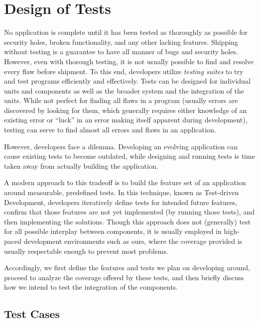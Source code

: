 \chapter{Design of Tests}

No application is complete until it has been tested
as thoroughly as possible for security holes, broken
functionality, and any other lacking features.
Shipping without testing is a guarantee to have
all manner of bugs and security holes. However, even
with thorough testing, it is not usually possible to
find and resolve every flaw before shipment. To this end,
developers utilize \emph{testing suites} to try and
test programs efficiently and effectively. Tests can be
designed for individual units and components as well as
the broader system and the integration of the units.
While not perfect for finding all flaws in a program
(usually errors are discovered by looking
for them, which generally requires either knowledge of an
existing error or ``luck'' in an error making itself
apparent during development), testing can serve to find
almost all errors and flaws in an application.

However, developers face a dilemma. Developing an
evolving application can cause existing tests to
become outdated, while designing and running tests
is time taken away from actually building the application.

A modern approach to this tradeoff is to build the
feature set of an application around measurable,
predefined tests. \cite{wiki:tdd} In this technique,
known as Test-driven Development, developers iteratively
define tests for intended future features, confirm that those
features are not yet implemented (by running those tests),
and then implementing the solutions. Though this approach
does not (generally) test for all possible interplay
between components, it is usually employed in high-paced
development environments such as ours, where the coverage provided is
usually respectable enough to prevent most problems.

Accordingly, we first define the features and tests we
plan on developing around, proceed to analyze the coverage
offered by these tests, and then briefly discuss how we
intend to test the integration of the components.

\section{Test Cases}

